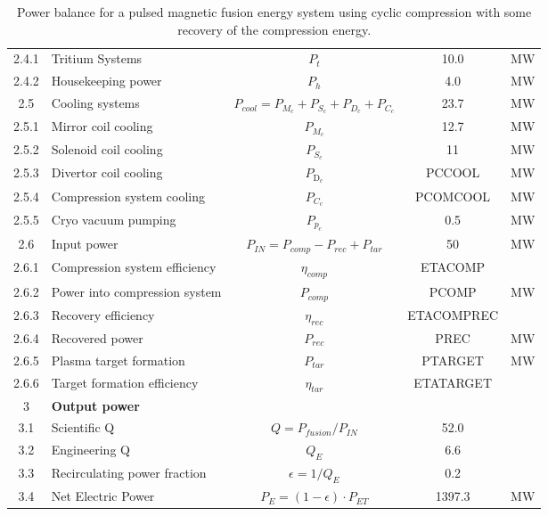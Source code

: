 \begin{table}[ht!]
\begin{tabular}{|c|p{5cm}|c|c|c|}
2.4.1	&	Tritium Systems	&	$P_{{t}}$	&	10.0	&	MW \\
2.4.2	&	Housekeeping power	&	$P_{{h}}$	&	4.0	&	MW \\
2.5	&	Cooling systems	&	$P_{cool} = P_{{M}_c} + P_{{S}_c} + P_{{D}_c}+ P_{{C}_c}$	&	23.7	&	MW \\
2.5.1	&	Mirror coil cooling	&	$P_{{M}_c}$	&	12.7	&	MW \\
2.5.2	&	Solenoid coil cooling	&	$P_{{S}_c}$	&	11	&	MW \\
2.5.3 & Divertor coil cooling & $P_{\text{D}_c}$ & PCCOOL & MW \\
2.5.4	&	Compression system cooling	&	$P_{{C}_c}$	&	PCOMCOOL	&	MW \\
2.5.5	&	Cryo vacuum pumping	&	$P_{{p}_c}$	&	0.5	&	MW \\
2.6	& Input power	& $P_{IN} = P_{comp}-P_{{rec}} + P_{tar}$	&	50	&	MW \\
2.6.1	&	Compression system efficiency	&	$\eta_{{comp}}$	&	ETACOMP	&	\\
2.6.2	&	Power into compression system	&	$P_{{comp}}$	&	PCOMP	&	MW \\
2.6.3	&	Recovery efficiency	&	$\eta_{{rec}}$	&	ETACOMPREC	&	 \\
2.6.4	&	Recovered power	&	$P_{{rec}}$	&	PREC	&	MW \\
2.6.5	&	Plasma target formation	&	$P_{{tar}}$	&	PTARGET	&	MW \\
2.6.6	&	Target formation efficiency	&	$\eta_{tar}$	&	ETATARGET	&	 \\

\hline								
3	&	\textbf{Output power}	&		&		&	\\
\hline
3.1	&	Scientific Q	&	$Q = P_{{fusion}}/P_{{IN}}$	&	52.0	&	\\
3.2	&	Engineering Q	&	$Q_{{E}}$	&	6.6	&	\\
3.3	&	Recirculating power fraction	&	$\epsilon = 1/Q_{{E}}$	&	0.2	&	\\
3.4	&	Net Electric Power	&	$P_{{E}} = (1 - \epsilon) \cdot P_{{ET}}$	&	1397.3	&	MW \\
\hline								
\end{tabular}	
\caption{Power balance for a pulsed magnetic fusion energy system using cyclic compression with some recovery of the compression energy.}
\label{tab:powerbalance}
\end{table}



